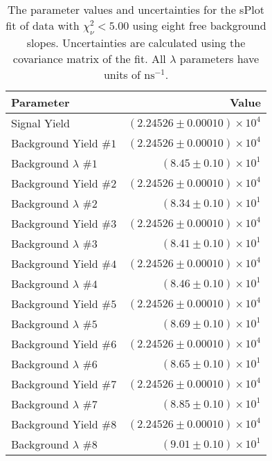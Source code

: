 
\begin{table}[h]
    \begin{center}
        \begin{tabular}{lr}\toprule
            Parameter & Value \\\midrule
            Signal Yield & $(2.24526 \pm 0.00010) \times 10^{4}$ \\
            Background Yield $\#1$ & $(2.24526 \pm 0.00010) \times 10^{4}$ \\
            Background $\lambda$ $\#1$ & $(8.45 \pm 0.10) \times 10^{1}$ \\
            Background Yield $\#2$ & $(2.24526 \pm 0.00010) \times 10^{4}$ \\
            Background $\lambda$ $\#2$ & $(8.34 \pm 0.10) \times 10^{1}$ \\
            Background Yield $\#3$ & $(2.24526 \pm 0.00010) \times 10^{4}$ \\
            Background $\lambda$ $\#3$ & $(8.41 \pm 0.10) \times 10^{1}$ \\
            Background Yield $\#4$ & $(2.24526 \pm 0.00010) \times 10^{4}$ \\
            Background $\lambda$ $\#4$ & $(8.46 \pm 0.10) \times 10^{1}$ \\
            Background Yield $\#5$ & $(2.24526 \pm 0.00010) \times 10^{4}$ \\
            Background $\lambda$ $\#5$ & $(8.69 \pm 0.10) \times 10^{1}$ \\
            Background Yield $\#6$ & $(2.24526 \pm 0.00010) \times 10^{4}$ \\
            Background $\lambda$ $\#6$ & $(8.65 \pm 0.10) \times 10^{1}$ \\
            Background Yield $\#7$ & $(2.24526 \pm 0.00010) \times 10^{4}$ \\
            Background $\lambda$ $\#7$ & $(8.85 \pm 0.10) \times 10^{1}$ \\
            Background Yield $\#8$ & $(2.24526 \pm 0.00010) \times 10^{4}$ \\
            Background $\lambda$ $\#8$ & $(9.01 \pm 0.10) \times 10^{1}$ \\\bottomrule
        \end{tabular}
        \caption{The parameter values and uncertainties for the sPlot fit of data with $\chi^2_\nu < 5.00$ using eight free background slopes. Uncertainties are calculated using the covariance matrix of the fit. All $\lambda$ parameters have units of $\si{\nano\second}^{-1}$.}
    \end{center}
\end{table}
